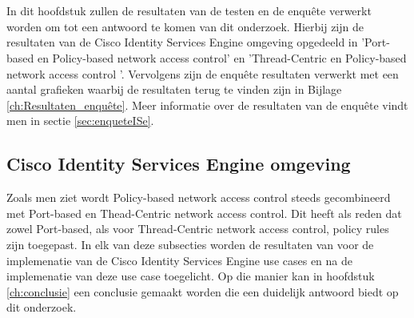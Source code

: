 
 \chapter{}
\label{ch:Resultaten}
In dit hoofdstuk zullen de resultaten van de testen en de enquête verwerkt worden om tot een antwoord te komen van dit onderzoek. Hierbij zijn de resultaten van de Cisco Identity Services Engine omgeving opgedeeld in 'Port-based en Policy-based network access control' en 'Thread-Centric en Policy-based network access control '. Vervolgens zijn de enquête resultaten verwerkt met een aantal grafieken waarbij de resultaten terug te vinden zijn in Bijlage \ref{ch:Resultaten_enquête}. Meer informatie over de resultaten van de enquête vindt men in sectie \ref{sec:enqueteISe}.

\section{Cisco Identity Services Engine omgeving}
Zoals men ziet wordt Policy-based network access control steeds gecombineerd met Port-based en Thead-Centric network access control. Dit heeft als reden dat zowel Port-based, als voor Thread-Centric network access control, policy rules zijn toegepast. In elk van deze subsecties worden de resultaten van voor de implemenatie van de Cisco Identity Services Engine use cases  en na de implemenatie van deze use case toegelicht. Op die manier kan in hoofdstuk \ref{ch:conclusie} een conclusie gemaakt worden die een duidelijk antwoord biedt op dit onderzoek.  
